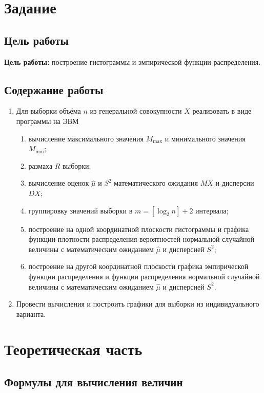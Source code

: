 \documentclass[12pt]{report}
\begin{document}
	

	\chapter{Задание}

	\section{Цель работы}

	\textbf{Цель работы:} построение гистограммы и эмпирической функции распределения.

	\section{Содержание работы}

	\begin{enumerate}
		\item Для выборки объёма $n$ из генеральной совокупности $X$ реализовать в виде программы на ЭВМ
			\begin{enumerate}
				\item вычисление максимального значения $M_{\max}$ и минимального значения $M_{\min}$;
				\item размаха $R$ выборки;
				\item вычисление оценок $\hat\mu$ и $S^2$ математического ожидания $MX$ и дисперсии $DX$;
				\item группировку значений выборки в $m = [\log_2 n] + 2$ интервала;
				\item построение на одной координатной плоскости гистограммы и графика функции плотности распределения вероятностей нормальной случайной величины с математическим ожиданием $\hat{\mu}$ и дисперсией $S^2$;
				\item построение на другой координатной плоскости графика эмпирической функции распределения и функции распределения нормальной случайной величины с математическим ожиданием $\hat{\mu}$ и дисперсией $S^2$.
			\end{enumerate}
		\item Провести вычисления и построить графики для выборки из индивидуального варианта.
	\end{enumerate}

\chapter{Теоретическая часть}

\section{Формулы для вычисления величин}
\end{document}
